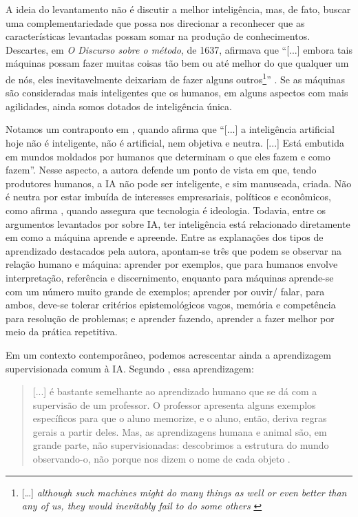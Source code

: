 \documentclass[portuguese]{textolivre}
\begin{document}
A ideia do levantamento não é discutir a melhor inteligência, mas, de fato, buscar uma complementariedade que possa nos direcionar a reconhecer que as características levantadas possam somar na produção de conhecimentos. Descartes, em \emph{O Discurso sobre o método}, de 1637, afirmava que “[...] embora tais máquinas possam fazer muitas coisas tão bem ou até melhor do que qualquer um de nós, eles inevitavelmente deixariam de fazer alguns outros\footnote{[…] \emph{although such machines might do many things as well or even better than any of us, they would inevitably fail to do some others} \cite[p. 57]{mclean2006}}” \cite[p. 57, tradução nossa]{mclean2006}. Se as máquinas são consideradas mais inteligentes que os humanos, em alguns aspectos com mais agilidades, ainda somos dotados de inteligência única.

Notamos um contraponto em \textcite[p. 249-250]{2022kaufman}, quando afirma que “[...] a inteligência artificial hoje não é inteligente, não é artificial, nem objetiva e neutra. [...] Está embutida em mundos moldados por humanos que determinam o que eles fazem e como fazem”. Nesse aspecto, a autora defende um ponto de vista em que, tendo produtores humanos, a IA não pode ser inteligente, e sim manuseada, criada. Não é neutra por estar imbuída de interesses empresariais, políticos e econômicos, como afirma \textcite{feenberg2004}, quando assegura que tecnologia é ideologia. Todavia, entre os argumentos levantados por \textcite{santaella2023inteligencia} sobre IA, ter inteligência está relacionado diretamente em como a máquina aprende e apreende. Entre as explanações dos tipos de aprendizado destacados pela autora, apontam-se três que podem se observar na relação humano e máquina: aprender por exemplos, que para humanos envolve interpretação, referência e discernimento, enquanto para máquinas aprende-se com um número muito grande de exemplos; aprender por ouvir/ falar, para ambos, deve-se tolerar critérios epistemológicos vagos, memória e competência para resolução de problemas; e aprender fazendo, aprender a fazer melhor por meio da prática repetitiva.

Em um contexto contemporâneo, podemos acrescentar ainda a aprendizagem supervisionada comum à IA. Segundo \textcite[p. 180]{santaella2023inteligencia}, essa aprendizagem:

\begin{quote}
    [...] é bastante semelhante ao aprendizado humano que se dá com a supervisão de um professor. O professor apresenta alguns exemplos específicos para que o aluno memorize, e o aluno, então, deriva regras gerais a partir deles. Mas, as aprendizagens humana e animal são, em grande parte, não supervisionadas: descobrimos a estrutura do mundo observando-o, não porque nos dizem o nome de cada objeto \cite[p. 180]{santaella2023inteligencia}.
\end{quote}
\end{document}
